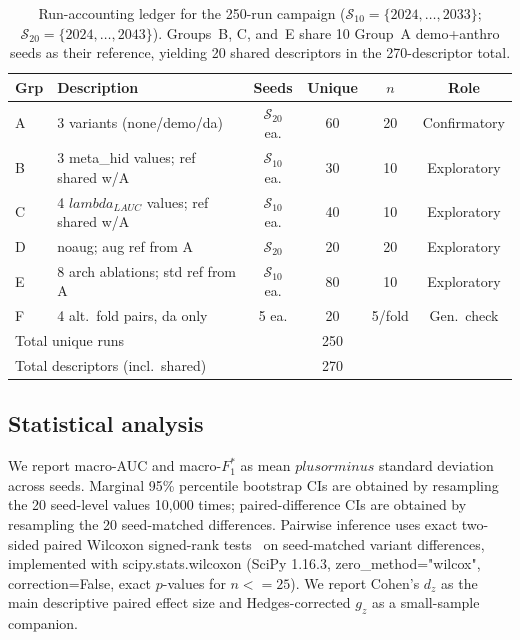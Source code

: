 \documentclass[mathematics,article,pdftex]{Definitions/mdpi}
\def\texttt#1{#1}%
\def\mathrm#1{#1}%
\def\textbf#1{#1}%
\def\pm{plus or minus }%
\def\lambda{lambda }%
\def\leq{<=}%
\begin{document}
\begin{table}[H]
\caption{Run-accounting ledger for the 250-run campaign ($\mathcal{S}_{10}{=}\{2024,\ldots,2033\}$; $\mathcal{S}_{20}{=}\{2024,\ldots,2043\}$). Groups~B, C, and~E share 10 Group~A \texttt{demo+anthro} seeds as their reference, yielding 20 shared descriptors in the 270-descriptor total.}\label{tab:run_ledger}
\small\centering
\begin{tabular}{llcccc}
\toprule
\textbf{Grp} & \textbf{Description} & \textbf{Seeds} & \textbf{Unique} & \textbf{$n$} & \textbf{Role} \\
\midrule
A & 3 variants (none/demo/da) & $\mathcal{S}_{20}$ ea. & 60 & 20 & Confirmatory \\
B & 3 meta\_hid values; ref shared w/A & $\mathcal{S}_{10}$ ea. & 30 & 10 & Exploratory \\
C & 4 $\lambda_{\mathrm{LAUC}}$ values; ref shared w/A & $\mathcal{S}_{10}$ ea. & 40 & 10 & Exploratory \\
D & noaug; aug ref from A & $\mathcal{S}_{20}$ & 20 & 20 & Exploratory \\
E & 8 arch ablations; std ref from A & $\mathcal{S}_{10}$ ea. & 80 & 10 & Exploratory \\
F & 4 alt.\ fold pairs, \texttt{da} only & 5 ea. & 20 & 5/fold & Gen.\ check \\
\midrule
\multicolumn{3}{l}{\textbf{Total unique runs}} & \textbf{250} & & \\
\multicolumn{3}{l}{\textbf{Total descriptors (incl.\ shared)}} & \textbf{270} & & \\
\bottomrule
\end{tabular}
\end{table}

\subsection{Statistical analysis}
We report macro-AUC and macro-$F_1^{\ast}$ as mean $\pm$ standard deviation across seeds. Marginal 95\% percentile bootstrap CIs are obtained by resampling the 20 seed-level values 10{,}000 times; paired-difference CIs are obtained by resampling the 20 seed-matched differences. Pairwise inference uses exact two-sided paired Wilcoxon signed-rank tests~\cite{Hollander2014} on seed-matched variant differences, implemented with \texttt{scipy.stats.wilcoxon} (SciPy 1.16.3, \texttt{zero\_method="wilcox"}, \texttt{correction=False}, exact $p$-values for $n{\leq}25$). We report Cohen's $d_{\mathrm{z}}$ as the main descriptive paired effect size and Hedges-corrected $g_{\mathrm{z}}$ as a small-sample companion.
\end{document}
